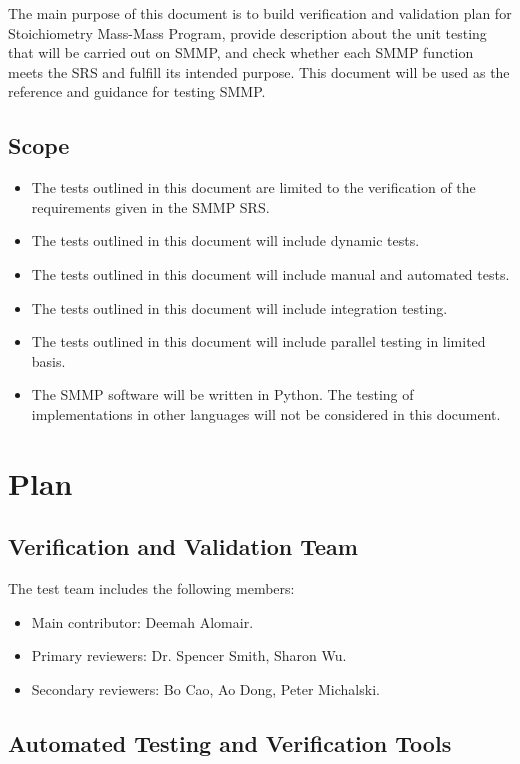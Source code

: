 \documentclass[12pt, titlepage]{article}
\begin{document}
The main purpose of this document is to build verification and validation plan for Stoichiometry Mass-Mass Program, provide  description about the unit testing that will be carried out on SMMP, and check whether each SMMP function meets the SRS and fulfill its intended purpose. This document will be used as the reference and guidance for testing SMMP.


\subsection{Scope}
\begin{itemize}
\item The tests outlined in this document are limited to the verification of the requirements given in the SMMP SRS. 
\item The tests outlined in this document will include dynamic tests.
\item The tests outlined in this document will include manual and automated tests.
\item The tests outlined in this document will include integration testing.
\item The tests outlined in this document will include parallel testing in limited basis.
\item The SMMP software will be written in Python. The testing of implementations in other languages will not be considered in this document.

\end{itemize}

\section{Plan}
	
\subsection{Verification and Validation Team}

The test team includes the following members:
\begin{itemize}
\item Main contributor: Deemah Alomair.
\item Primary reviewers: Dr. Spencer Smith, Sharon Wu.
\item Secondary reviewers: Bo Cao, Ao Dong, Peter Michalski.
\end{itemize}

\subsection{Automated Testing and Verification Tools}
\end{document}
